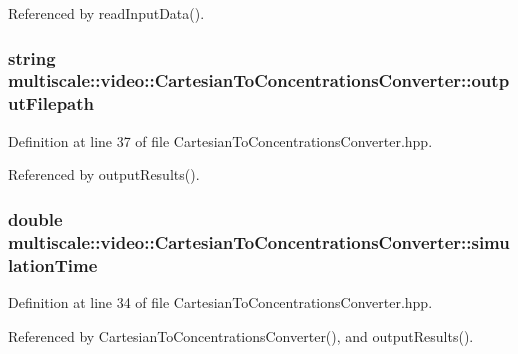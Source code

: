Referenced by read\-Input\-Data().

\hypertarget{classmultiscale_1_1video_1_1CartesianToConcentrationsConverter_a9215448e33876a581b206a89b6651fd0}{
\subsubsection[{output\-Filepath}]{\setlength{\rightskip}{0pt plus 5cm}string multiscale\-::video\-::\-Cartesian\-To\-Concentrations\-Converter\-::output\-Filepath\hspace{0.3cm}{\ttfamily [private]}}}\label{classmultiscale_1_1video_1_1CartesianToConcentrationsConverter_a9215448e33876a581b206a89b6651fd0}


Definition at line 37 of file Cartesian\-To\-Concentrations\-Converter.\-hpp.



Referenced by output\-Results().

\hypertarget{classmultiscale_1_1video_1_1CartesianToConcentrationsConverter_a6e66af60b82513b3186fdb32cad44597}{
\subsubsection[{simulation\-Time}]{\setlength{\rightskip}{0pt plus 5cm}double multiscale\-::video\-::\-Cartesian\-To\-Concentrations\-Converter\-::simulation\-Time\hspace{0.3cm}{\ttfamily [private]}}}\label{classmultiscale_1_1video_1_1CartesianToConcentrationsConverter_a6e66af60b82513b3186fdb32cad44597}


Definition at line 34 of file Cartesian\-To\-Concentrations\-Converter.\-hpp.



Referenced by Cartesian\-To\-Concentrations\-Converter(), and output\-Results().

